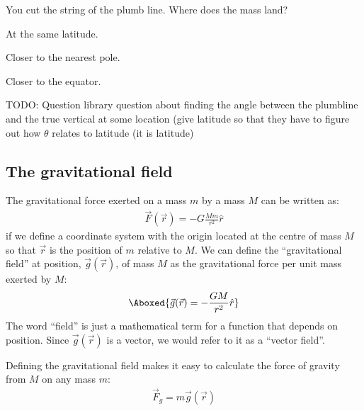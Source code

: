 
\begin{checkpoint}
\begin{MCquestion}{You cut the string of the plumb line. Where does the mass land?}
\item At the same latitude.
\item Closer to the nearest pole.
\item Closer to the equator. \correct
\end{MCquestion}
\end{checkpoint}




TODO: Question library question about finding the angle between the plumbline and the true vertical at some location (give latitude so that they have to figure out how $\theta$ relates to latitude (it is latitude)

\subsection{The gravitational field}
The gravitational force exerted on a mass $m$ by a mass $M$ can be written as:
\begin{align*}
\vec F(\vec r) = -G\frac{Mm}{r^2}\hat r
\end{align*}
if we define a coordinate system with the origin located at the centre of mass $M$ so that $\vec r$ is the position of $m$ relative to $M$. We can define the ``gravitational field'' at position, $\vec g(\vec r)$, of mass $M$ as the gravitational force per unit mass exerted by $M$:
\begin{align}
\Aboxed{\vec g(\vec r) = - \frac{GM}{r^2}\hat r}
\end{align}
The word ``field'' is just a mathematical term for a function that depends on position. Since $\vec g(\vec r)$ is a vector, we would refer to it as a ``vector field''.

Defining the gravitational field makes it easy to calculate the force of gravity from $M$ on any mass $m$:
\begin{align*}
\vec F_g = m\vec g(\vec r)
\end{align*}

